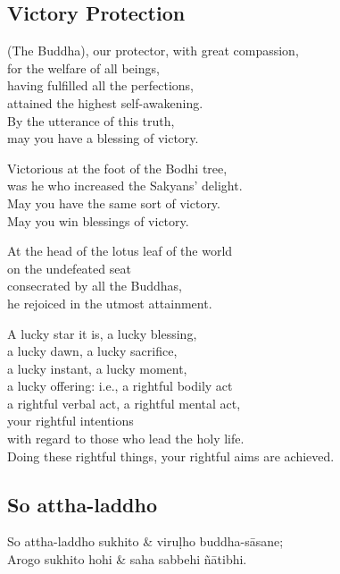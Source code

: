 

\subsection{Victory Protection}


(The Buddha), our protector, with great compassion,\\
for the welfare of all beings,\\
having fulfilled all the perfections,\\
attained the highest self-awakening.\\
By the utterance of this truth,\\
may you have a blessing of victory.

Victorious at the foot of the Bodhi tree,\\
was he who increased the Sakyans' delight.\\
May you have the same sort of victory.\\
May you win blessings of victory.

At the head of the lotus leaf of the world\\
on the undefeated seat\\
consecrated by all the Buddhas,\\
he rejoiced in the utmost attainment.

A lucky star it is, a lucky blessing,\\
a lucky dawn, a lucky sacrifice,\\
a lucky instant, a lucky moment,\\
a lucky offering: i.e., a rightful bodily act\\
a rightful verbal act, a rightful mental act,\\
your rightful intentions\\
with regard to those who lead the holy life.\\
Doing these rightful things,
your rightful aims are achieved.

\subsection{So attha-laddho}


\begin{twochants}
So attha-laddho sukhito & viruḷho buddha-sāsane;\\
Arogo sukhito hohi & saha sabbehi ñātibhi.\\
\end{twochants}

